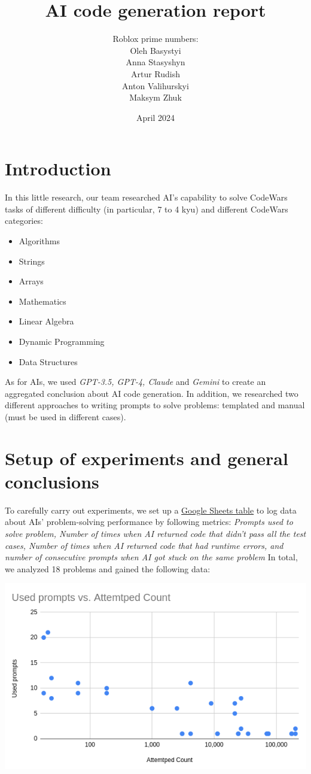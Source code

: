 \documentclass[12pt]{report}
\title{AI code generation report}
\author{Roblox prime numbers:\\\small{Oleh Basystyi}\\\small{Anna Stasyshyn}
\\\small{Artur Rudish}\\\small{Anton Valihurskyi}\\\small{Maksym Zhuk}}
\date{April 2024}
\begin{document}
	\maketitle
	\renewcommand{\thesection}{\arabic{section}}
	\section{Introduction}
	\qquad In this little research, our team researched AI's capability to solve CodeWars tasks of different difficulty (in particular, 7 to 4 kyu) and different CodeWars categories:
	\begin{itemize}
		\itemsep0em
		\item Algorithms
		\item Strings
		\item Arrays
		\item Mathematics
		\item Linear Algebra
		\item Dynamic Programming
		\item Data Structures
	\end{itemize}
	\qquad As for AIs, we used \textit{GPT-3.5, GPT-4, Claude} and \textit{Gemini} to create an aggregated conclusion about AI code generation. In addition, we researched two different approaches to writing prompts to solve problems: templated and manual (must be used in different cases).

	\pagebreak
	\section{Setup of experiments and general conclusions}
	\qquad To carefully carry out experiments, we set up a \href{https://docs.google.com/spreadsheets/d/1qXPyAJsOOpmtxIoGqObwG5mTaLU3IWO0SQRGbjZPhEc/edit#gid=0}{Google Sheets table} to log data about AIs' problem-solving performance by following metrics: \textit{Prompts used to solve problem, Number of times when AI returned code that didn't pass all the test cases, Number of times when AI returned code that had runtime errors, and number of consecutive prompts when AI got stuck on the same problem} In total, we analyzed 18 problems and gained the following data:

	\includegraphics[width=\textwidth]{used_prompts_attempted_relation.png}
\end{document}
